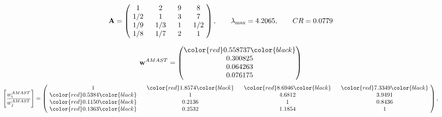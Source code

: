 \begin{example}
\begin{equation*}
\mathbf{A} =
\begin{pmatrix}
$\,\,$ 1 $\,\,$ & $\,\,$2$\,\,$ & $\,\,$9$\,\,$ & $\,\,$8 $\,\,$ \\
$\,\,$ 1/2$\,\,$ & $\,\,$ 1 $\,\,$ & $\,\,$3$\,\,$ & $\,\,$7 $\,\,$ \\
$\,\,$ 1/9$\,\,$ & $\,\,$ 1/3$\,\,$ & $\,\,$ 1 $\,\,$ & $\,\,$ 1/2 $\,\,$ \\
$\,\,$ 1/8$\,\,$ & $\,\,$ 1/7$\,\,$ & $\,\,$2$\,\,$ & $\,\,$ 1  $\,\,$ \\
\end{pmatrix},
\qquad
\lambda_{\max} =
4.2065,
\qquad
CR = 0.0779
\end{equation*}

\begin{equation*}
\mathbf{w}^{AMAST} =
\begin{pmatrix}
\color{red} 0.558737\color{black} \\
0.300825\\
0.064263\\
0.076175
\end{pmatrix}\end{equation*}
\begin{equation*}
\left[ \frac{{w}^{AMAST}_i}{{w}^{AMAST}_j} \right] =
\begin{pmatrix}
$\,\,$ 1 $\,\,$ & $\,\,$\color{red} 1.8574\color{black} $\,\,$ & $\,\,$\color{red} 8.6946\color{black} $\,\,$ & $\,\,$\color{red} 7.3349\color{black} $\,\,$ \\
$\,\,$\color{red} 0.5384\color{black} $\,\,$ & $\,\,$ 1 $\,\,$ & $\,\,$4.6812$\,\,$ & $\,\,$3.9491  $\,\,$ \\
$\,\,$\color{red} 0.1150\color{black} $\,\,$ & $\,\,$0.2136$\,\,$ & $\,\,$ 1 $\,\,$ & $\,\,$0.8436 $\,\,$ \\
$\,\,$\color{red} 0.1363\color{black} $\,\,$ & $\,\,$0.2532$\,\,$ & $\,\,$1.1854$\,\,$ & $\,\,$ 1  $\,\,$ \\
\end{pmatrix},
\end{equation*}


\end{example}
